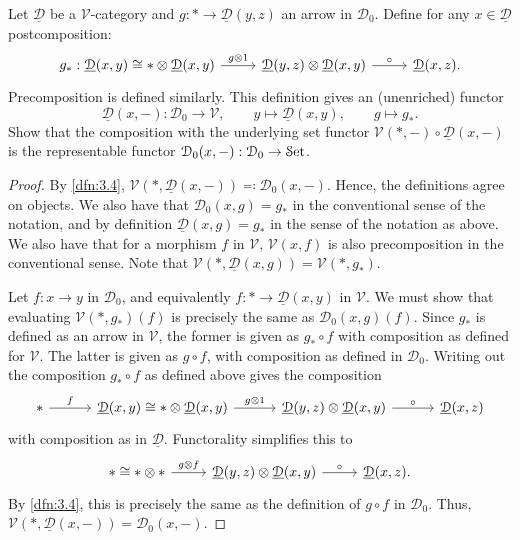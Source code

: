 \begin{exercise}
	Let $\underline{\mathcal{D} } $ be a $\mathcal{V} $-category and $g : * \to \underline{\mathcal{D} } (y,z)$ an arrow in $\mathcal{D} _0$. Define for any $x\in \underline{\mathcal{D} } $ postcomposition:
	\[\begin{tikzcd}[row sep = 2.5em, column sep = 2.5em]
	g_*: \underline{\mathcal{D} } (x,y)\cong *\otimes \underline{\mathcal{D} } (x,y)\ar[" g\otimes 1 ", r]  & \underline{\mathcal{D} } (y,z)\otimes \underline{\mathcal{D} } (x,y)\ar[" \circ ", r]  & \underline{\mathcal{D} } (x,z).
	\end{tikzcd}\]
	Precomposition is defined similarly. This definition gives an (unenriched) functor
	\[
		\underline{\mathcal{D} } (x,-): \mathcal{D} _0 \to \mathcal{V} ,\qquad y\mapsto \underline{\mathcal{D} } (x,y),\qquad g\mapsto g_*
	.\]
	Show that the composition with the underlying set functor $\mathcal{V} (*,-)\circ \underline{\mathcal{D} } (x,-)$ is the representable functor $\mathcal{D} _0(x,-): \mathcal{D} _0 \to \mathcal{S}\mathrm{et} $.
\end{exercise}
\begin{proof}
	By \cref{dfn:3.4}, $\mathcal{V} (*,\underline{\mathcal{D} } (x,-))\eqqcolon \mathcal{D} _0(x,-)$. Hence, the definitions agree on objects. We also have that $\mathcal{D} _0(x,g)=g_*$ in the conventional sense of the notation, and by definition $\underline{\mathcal{D} } (x,g)=g_*$ in the sense of the notation as above. We also have that for a morphism $f$ in $\mathcal{V} $, $\mathcal{V} (x,f)$ is also precomposition in the conventional sense. Note that $\mathcal{V} (*,\underline{\mathcal{D} } (x,g))=\mathcal{V} (*,g_*)$.

	Let $f : x \to y$ in $\mathcal{D} _0$, and equivalently $f : * \to \underline{\mathcal{D} } (x,y)$ in $\mathcal{V} $. We must show that evaluating $\mathcal{V} (*,g_*)(f)$ is precisely the same as $\mathcal{D} _0(x,g)(f)$. Since $g_*$ is defined as an arrow in $\mathcal{V} $, the former is given as $g_*\circ f$ with composition as defined for $\mathcal{V} $. The latter is given as $g\circ f$, with composition as defined in $\mathcal{D} _0$. Writing out the composition $g_*\circ f$ as defined above gives the composition
	\[\begin{tikzcd}[row sep = 3em, column sep = 3em]
	*\ar[" f ", r]  & \underline{\mathcal{D} } (x,y)\cong *\otimes \underline{\mathcal{D} } (x,y)\ar[" g\otimes 1 ", r]  & \underline{\mathcal{D} } (y,z)\otimes \underline{\mathcal{D} } (x,y)\ar[" \circ  ", r]  & \underline{\mathcal{D} } (x,z)
	\end{tikzcd}\]
	with composition as in $\underline{\mathcal{D} } $. Functorality simplifies this to
	\[\begin{tikzcd}[row sep = 3em, column sep = 2.5em]
	*\cong *\otimes *\ar[" g\otimes f ", r]  & \underline{\mathcal{D} } (y,z)\otimes \underline{\mathcal{D} } (x,y)\ar[" \circ  ", r]  & \underline{\mathcal{D} } (x,z).
	\end{tikzcd}\]
	By \cref{dfn:3.4}, this is precisely the same as the definition of $g\circ f$ in $\mathcal{D} _0$. Thus, $\mathcal{V} (*,\underline{\mathcal{D} } (x,-))=\mathcal{D} _0(x,-)$.
\end{proof}

